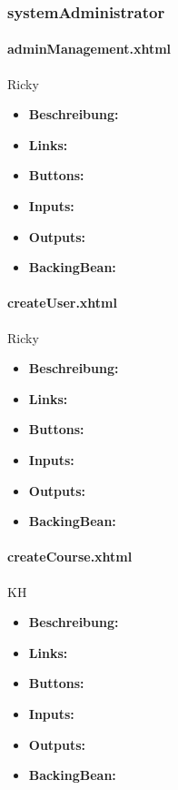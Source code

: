 			\subsubsection{systemAdministrator}
			
				\paragraph{adminManagement.xhtml}
				Ricky
					\begin{itemize}
						\item \textbf{Beschreibung:}
						\item \textbf{Links:}
						\item \textbf{Buttons:}
						\item \textbf{Inputs:}
						\item \textbf{Outputs:}
						\item \textbf{BackingBean:}
					\end{itemize}
				
				\paragraph{createUser.xhtml}
				Ricky
					\begin{itemize}
						\item \textbf{Beschreibung:}
						\item \textbf{Links:}
						\item \textbf{Buttons:}
						\item \textbf{Inputs:}
						\item \textbf{Outputs:}
						\item \textbf{BackingBean:}
					\end{itemize}
				
				\paragraph{createCourse.xhtml}
					KH\\
					\begin{itemize}
						\item \textbf{Beschreibung:}
						\item \textbf{Links:}
						\item \textbf{Buttons:}
						\item \textbf{Inputs:}
						\item \textbf{Outputs:}
						\item \textbf{BackingBean:}
					\end{itemize}
				
